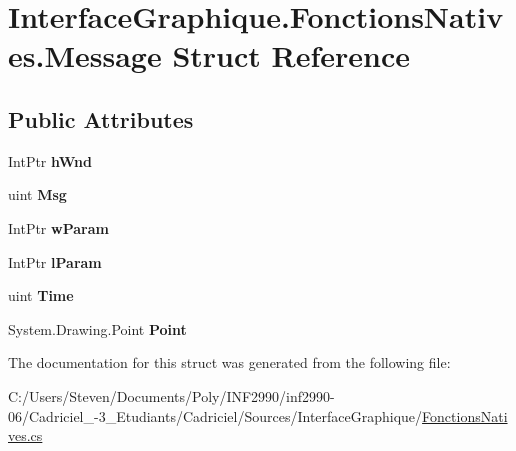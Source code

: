 \hypertarget{struct_interface_graphique_1_1_fonctions_natives_1_1_message}{}\section{Interface\+Graphique.\+Fonctions\+Natives.\+Message Struct Reference}
\label{struct_interface_graphique_1_1_fonctions_natives_1_1_message}
\subsection*{Public Attributes}
\begin{DoxyCompactItemize}
\item 
Int\+Ptr {\bfseries h\+Wnd}
\item 
uint {\bfseries Msg}
\item 
Int\+Ptr {\bfseries w\+Param}
\item 
Int\+Ptr {\bfseries l\+Param}
\item 
uint {\bfseries Time}
\item 
System.\+Drawing.\+Point {\bfseries Point}
\end{DoxyCompactItemize}


The documentation for this struct was generated from the following file\+:\begin{DoxyCompactItemize}
\item 
C\+:/\+Users/\+Steven/\+Documents/\+Poly/\+I\+N\+F2990/inf2990-\/06/\+Cadriciel\+\_-\/3\+\_\+\+Etudiants/\+Cadriciel/\+Sources/\+Interface\+Graphique/\hyperlink{_fonctions_natives_8cs}{Fonctions\+Natives.\+cs}\end{DoxyCompactItemize}
